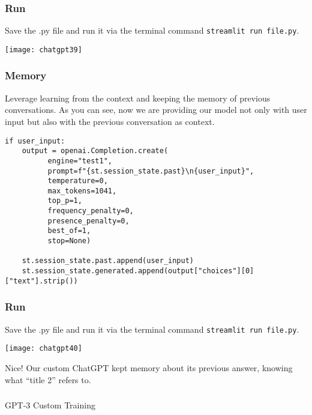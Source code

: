 \begin{frame}[fragile]\frametitle{ Run}
 Save the .py file and run it via the terminal command \lstinline|streamlit run file.py|.

\begin{center}
\texttt{[image: chatgpt39]}
\end{center}

\end{frame}

\begin{frame}[fragile]\frametitle{Memory}

Leverage learning from the context and keeping the memory of previous conversations. As you can see, now we are providing our model not only with user input but also with the previous conversation as context. 


\begin{lstlisting}
if user_input:
    output = openai.Completion.create(
          engine="test1",
          prompt=f"{st.session_state.past}\n{user_input}",
          temperature=0,
          max_tokens=1041,
          top_p=1,
          frequency_penalty=0,
          presence_penalty=0,
          best_of=1,
          stop=None)

    st.session_state.past.append(user_input)
    st.session_state.generated.append(output["choices"][0]["text"].strip())
\end{lstlisting}	 


\end{frame}


\begin{frame}[fragile]\frametitle{ Run}
 Save the .py file and run it via the terminal command \lstinline|streamlit run file.py|.

\begin{center}
\texttt{[image: chatgpt40]}
\end{center}

Nice! Our custom ChatGPT kept memory about its previous answer, knowing what “title 2” refers to.

\end{frame}

\begin{frame}[fragile]\frametitle{}
\begin{center}
{\Large GPT-3 Custom Training}
\end{center}
\end{frame}

